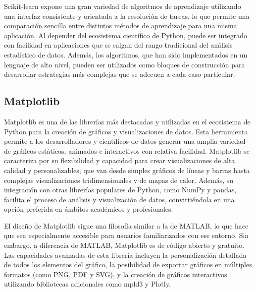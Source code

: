 Scikit-learn expone una gran variedad de algoritmos de aprendizaje utilizando una interfaz consistente y orientada a la resolución de tareas, lo que permite una comparación sencilla entre distintos métodos de aprendizaje para una misma aplicación. Al depender del ecosistema científico de Python, puede ser integrado con facilidad en aplicaciones que se salgan del rango tradicional del análisis estadístico de datos. Además, los algoritmos, que han sido implementados en un lenguaje de alto nivel, pueden ser utilizados como bloques de construcción para desarrollar estrategias más complejas que se adecuen a cada caso particular.


\subsection{Matplotlib}
\label{subsec:matplotlib}

Matplotlib es una de las librerías más destacadas y utilizadas en el ecosistema de Python para la creación de gráficos y visualizaciones de datos. Esta herramienta permite a los desarrolladores y científicos de datos generar una amplia variedad de gráficos estáticos, animados e interactivos con relativa facilidad. Matplotlib se caracteriza por su flexibilidad y capacidad para crear visualizaciones de alta calidad y personalizables, que van desde simples gráficos de líneas y barras hasta complejas visualizaciones tridimensionales y de mapas de calor. Además, su integración con otras librerías populares de Python, como NumPy y pandas, facilita el proceso de análisis y visualización de datos, convirtiéndola en una opción preferida en ámbitos académicos y profesionales.

El diseño de Matplotlib sigue una filosofía similar a la de MATLAB, lo que hace que sea especialmente accesible para usuarios familiarizados con ese entorno. Sin embargo, a diferencia de MATLAB, Matplotlib es de código abierto y gratuito. Las capacidades avanzadas de esta librería incluyen la personalización detallada de todos los elementos del gráfico, la posibilidad de exportar gráficos en múltiples formatos (como PNG, PDF y SVG), y la creación de gráficos interactivos utilizando bibliotecas adicionales como mpld3 y Plotly. 

